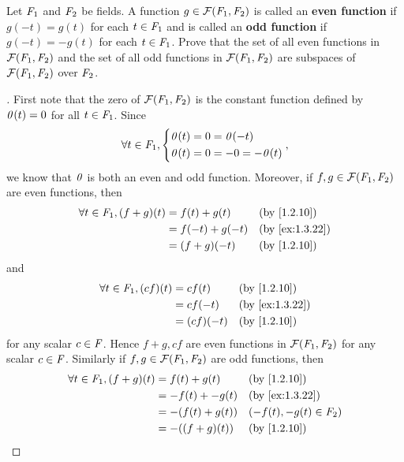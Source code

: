 \begin{ex}\label{ex:1.3.22}
  Let \(\mathit{F}_1\) and \(\mathit{F}_2\) be fields.
  A function \(g \in \mathcal{F}(\mathit{F}_1, \mathit{F}_2)\) is called an \textbf{even function} if \(g(-t) = g(t)\) for each \(t \in \mathit{F}_1\) and is called an \textbf{odd function} if \(g(-t) = -g(t)\) for each \(t \in \mathit{F}_1\).
  Prove that the set of all even functions in \(\mathcal{F}(\mathit{F}_1, \mathit{F}_2)\) and the set of all odd functions in \(\mathcal{F}(\mathit{F}_1, \mathit{F}_2)\) are subspaces of \(\mathcal{F}(\mathit{F}_1, \mathit{F}_2)\) over \(\mathit{F}_2\).
\end{ex}

\begin{proof}[]
  First note that the zero of \(\mathcal{F}(\mathit{F}_1, \mathit{F}_2)\) is the constant function defined by \(\mathit{0}(t) = 0\) for all \(t \in \mathit{F}_1\).
  Since
  \[
    \forall t \in \mathit{F}_1, \begin{dcases}
      \mathit{0}(t) = 0 = \mathit{0}(-t) \\
      \mathit{0}(t) = 0 = -0 = -\mathit{0}(t)
    \end{dcases},
  \]
  we know that \(\mathit{0}\) is both an even and odd function.
  Moreover, if \(f, g \in \mathcal{F}(\mathit{F}_1, \mathit{F}_2)\) are even functions, then
  \begin{align*}
    \forall t \in \F_1, (f + g)(t) & = f(t) + g(t)   &  & \by{1.2.10}    \\
                                   & = f(-t) + g(-t) &  & \by{ex:1.3.22} \\
                                   & = (f + g)(-t)   &  & \by{1.2.10}
  \end{align*}
  and
  \begin{align*}
    \forall t \in \F_1, (cf)(t) & = cf(t)    &  & \by{1.2.10}    \\
                                & = cf(-t)   &  & \by{ex:1.3.22} \\
                                & = (cf)(-t) &  & \by{1.2.10}
  \end{align*}
  for any scalar \(c \in \mathit{F}\).
  Hence \(f + g, cf\) are even functions in \(\mathcal{F}(\mathit{F}_1, \mathit{F}_2)\) for any scalar \(c \in \mathit{F}\).
  Similarly if \(f, g \in \mathcal{F}(\mathit{F}_1, \mathit{F}_2)\) are odd functions, then
  \begin{align*}
    \forall t \in \F_1, (f + g)(t) & = f(t) + g(t)    &  & \by{1.2.10}             \\
                                   & = -f(t) + -g(t)  &  & \by{ex:1.3.22}          \\
                                   & = -(f(t) + g(t)) &  & (-f(t), -g(t) \in \F_2) \\
                                   & = -((f + g)(t))  &  & \by{1.2.10}             \\

\end{align*}
\end{proof}
